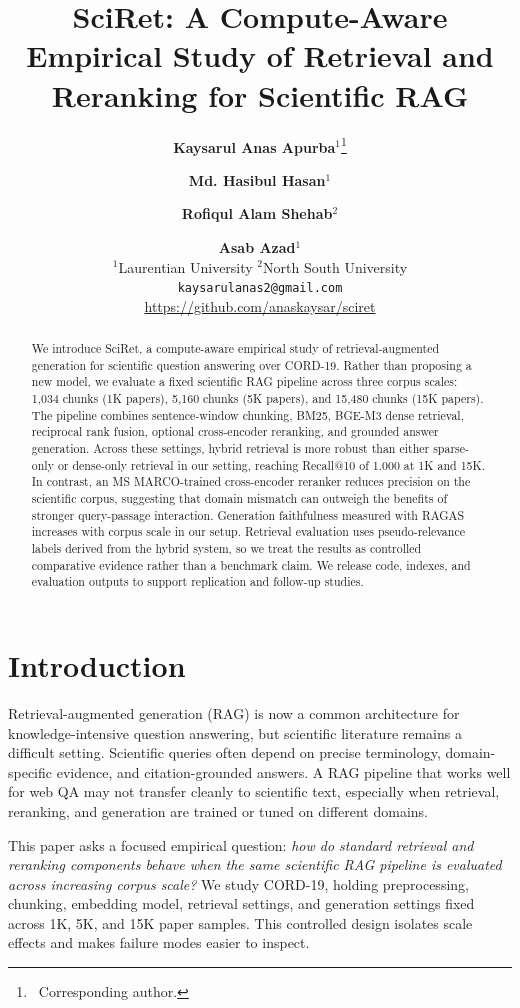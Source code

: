 \documentclass[11pt]{article}
\title{SciRet: A Compute-Aware Empirical Study of Retrieval and Reranking for Scientific RAG}
\author{
  {\bf Kaysarul Anas Apurba}$^{1}$\thanks{~Corresponding author.} \and 
  {\bf Md. Hasibul Hasan}$^{1}$ \and 
  {\bf Rofiqul Alam Shehab}$^{2}$ \and
  {\bf Asab Azad}$^{1}$ \\
  $^{1}$Laurentian University \qquad $^{2}$North South University \\
  \texttt{kaysarulanas2@gmail.com} \\
  \url{https://github.com/anaskaysar/sciret}
}
\begin{document}
\maketitle
\thispagestyle{fancy}

\begin{abstract}
We introduce SciRet, a compute-aware empirical study of retrieval-augmented generation for scientific question answering over CORD-19. Rather than proposing a new model, we evaluate a fixed scientific RAG pipeline across three corpus scales: 1,034 chunks (1K papers), 5,160 chunks (5K papers), and 15,480 chunks (15K papers). The pipeline combines sentence-window chunking, BM25, BGE-M3 dense retrieval, reciprocal rank fusion, optional cross-encoder reranking, and grounded answer generation. Across these settings, hybrid retrieval is more robust than either sparse-only or dense-only retrieval in our setting, reaching Recall@10 of 1.000 at 1K and 15K. In contrast, an MS MARCO-trained cross-encoder reranker reduces precision on the scientific corpus, suggesting that domain mismatch can outweigh the benefits of stronger query-passage interaction. Generation faithfulness measured with RAGAS increases with corpus scale in our setup. Retrieval evaluation uses pseudo-relevance labels derived from the hybrid system, so we treat the results as controlled comparative evidence rather than a benchmark claim. We release code, indexes, and evaluation outputs to support replication and follow-up studies.
\end{abstract}

\section{Introduction}

Retrieval-augmented generation (RAG) is now a common architecture for knowledge-intensive question answering, but scientific literature remains a difficult setting. Scientific queries often depend on precise terminology, domain-specific evidence, and citation-grounded answers. A RAG pipeline that works well for web QA may not transfer cleanly to scientific text, especially when retrieval, reranking, and generation are trained or tuned on different domains.

This paper asks a focused empirical question: \emph{how do standard retrieval and reranking components behave when the same scientific RAG pipeline is evaluated across increasing corpus scale?} We study CORD-19, holding preprocessing, chunking, embedding model, retrieval settings, and generation settings fixed across 1K, 5K, and 15K paper samples. This controlled design isolates scale effects and makes failure modes easier to inspect.
\end{document}
